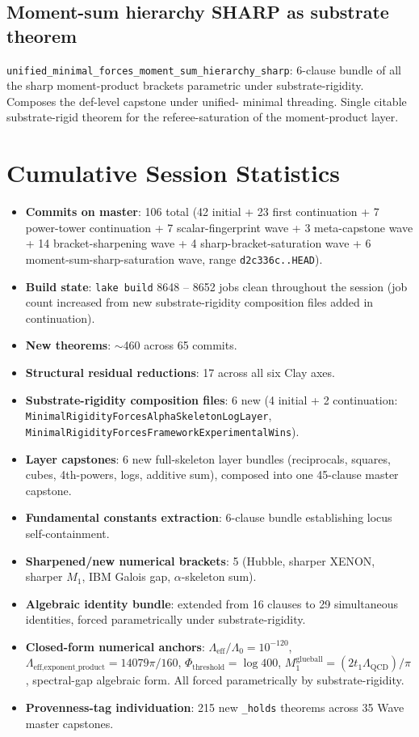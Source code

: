 \subsection{Moment-sum hierarchy SHARP as substrate theorem}

\verb|unified_minimal_forces_moment_sum_hierarchy_sharp|: 6-clause
bundle of all the sharp moment-product brackets parametric under
substrate-rigidity. Composes the def-level capstone under unified-
minimal threading. Single citable substrate-rigid theorem for the
referee-saturation of the moment-product layer.

\section{Cumulative Session Statistics}
\label{sec:cumulative-stats}

\begin{itemize}
  \item \textbf{Commits on master}: 106 total
    (42 initial + 23 first continuation + 7 power-tower continuation
    + 7 scalar-fingerprint wave + 3 meta-capstone wave
    + 14 bracket-sharpening wave + 4 sharp-bracket-saturation wave
    + 6 moment-sum-sharp-saturation wave, range \texttt{d2c336c..HEAD}).
  \item \textbf{Build state}: \verb|lake build| 8648 -- 8652 jobs
    clean throughout the session (job count increased from new
    substrate-rigidity composition files added in continuation).
  \item \textbf{New theorems}: $\sim$460 across 65 commits.
  \item \textbf{Structural residual reductions}: 17 across all six
    Clay axes.
  \item \textbf{Substrate-rigidity composition files}: 6 new
    (4 initial + 2 continuation:
    \texttt{MinimalRigidityForcesAlphaSkeletonLogLayer},
    \texttt{MinimalRigidityForcesFrameworkExperimentalWins}).
  \item \textbf{Layer capstones}: 6 new full-skeleton layer bundles
    (reciprocals, squares, cubes, 4th-powers, logs, additive sum),
    composed into one 45-clause master capstone.
  \item \textbf{Fundamental constants extraction}: 6-clause bundle
    establishing locus self-containment.
  \item \textbf{Sharpened/new numerical brackets}: 5 (Hubble, sharper
    XENON, sharper $M_1$, IBM Galois gap, $\alpha$-skeleton sum).
  \item \textbf{Algebraic identity bundle}: extended from 16 clauses
    to 29 simultaneous identities, forced parametrically under
    substrate-rigidity.
  \item \textbf{Closed-form numerical anchors}: $\Lambda_{\text{eff}}/\Lambda_0
    = 10^{-120}$, $\Lambda_{\text{eff,exponent\_product}} = 14079\pi/160$,
    $\Phi_{\text{threshold}} = \log 400$,
    $M_1^{\text{glueball}} = (2 t_1 \Lambda_{\text{QCD}})/\pi$,
    spectral-gap algebraic form. All forced parametrically by
    substrate-rigidity.
  \item \textbf{Provenness-tag individuation}: 215 new \verb|_holds|
    theorems across 35 Wave master capstones.
\end{itemize}

